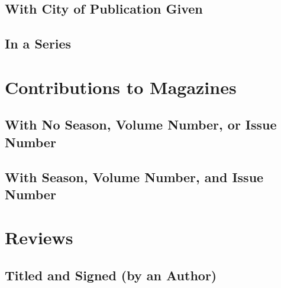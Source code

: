 \documentclass{article}
\begin{document}
\subsection{With City of Publication Given} %
\label{sub:with_city_of_publication_given}
\begin{refsection}
	\printbibliography[heading=none]
\end{refsection}
\subsection{In a Series} %
\label{sub:in_a_series}
\begin{refsection}
	\printbibliography[heading=none]
\end{refsection}

\section{Contributions to Magazines} %
\label{sec:contributions_to_magazines}
\subsection{With No Season, Volume Number, or Issue Number} %
\label{sub:with_no_season_volume_number_or_issue_number}
\begin{refsection}
	\printbibliography[heading=none]
\end{refsection}
\subsection{With Season, Volume Number, and Issue Number} %
\label{sub:with_season_volume_number_and_issue_number}
\begin{refsection}
	\printbibliography[heading=none]
\end{refsection}

\section{Reviews} %
\label{sec:reviews}
\subsection{Titled and Signed (by an Author)} %
\label{sub:titled_and_signed_by_an_author}
\begin{refsection}
	\printbibliography[heading=none]
\end{refsection}
\end{document}
